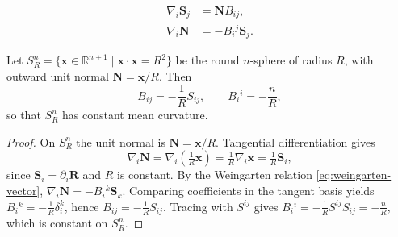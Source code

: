 \documentclass[10pt,a4paper]{amsart}
\begin{document}
\begin{align}
\nabla_i \mathbf{S}_j &= \mathbf{N} B_{ij}, \label{eq:gauss-vector}\\
\nabla_i \mathbf{N} &= - B_i{}^{j} \mathbf{S}_j. \label{eq:weingarten-vector}
\end{align}

\begin{lemma}\label{lem:Sn-CMC}
Let $S^n_R=\{\mathbf{x}\in\mathbb{R}^{n+1}\mid \mathbf{x}\cdot\mathbf{x}=R^2\}$ be the round $n$-sphere of radius $R$, with outward unit normal $\mathbf{N}=\mathbf{x}/R$. Then
\begin{equation}\label{eq:Sn-B}
B_{ij} = -\frac{1}{R}S_{ij}, 
\qquad 
B_i{}^{i}=-\frac{n}{R},
\end{equation}
so that $S^n_R$ has constant mean curvature.
\end{lemma}

\begin{proof}
On $S^n_R$ the unit normal is $\mathbf{N}=\mathbf{x}/R$. Tangential differentiation gives
\[
\nabla_i \mathbf{N}
=\nabla_i \left(\tfrac{1}{R}\mathbf{x}\right)
=\tfrac{1}{R}\nabla_i \mathbf{x}
=\tfrac{1}{R}\mathbf{S}_i,
\]
since $\mathbf{S}_i=\partial_i\mathbf{R}$ and $R$ is constant.  
By the Weingarten relation \eqref{eq:weingarten-vector},
\(
\nabla_i \mathbf{N}=-B_i{}^{k}\mathbf{S}_k.
\)
Comparing coefficients in the tangent basis yields
\(B_i{}^{k}=-\tfrac{1}{R}\delta_i^{k}\),
hence \(B_{ij}=-\tfrac{1}{R}S_{ij}\).  
Tracing with $S^{ij}$ gives
\(
B_i{}^{i}=-\tfrac{1}{R}S^{ij}S_{ij}=-\tfrac{n}{R},
\)
which is constant on $S^n_R$.
\end{proof}
\end{document}
